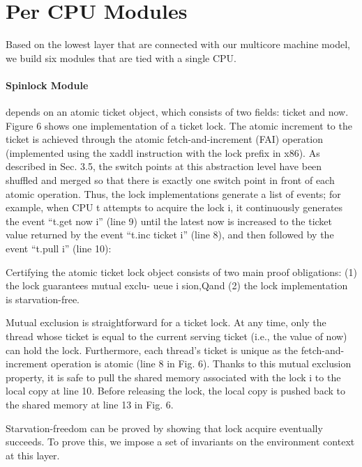 \section{Per CPU Modules}
\label{chapter:certikos:sec:per-cpu-modules}


Based on the lowest layer that are connected with our multicore machine model, 
we build six modules that are tied with a single CPU.

\paragraph{Spinlock Module}

depends on an atomic ticket object, which consists of two fields: ticket and now. Figure 6 shows one implementation of a ticket lock. The atomic increment to the ticket is achieved through the atomic fetch-and-increment (FAI) operation (implemented using the xaddl instruction with the lock prefix in x86). As described in Sec. 3.5, the switch points at this abstraction level have been shuffled and merged so that there is exactly one switch point in front of each atomic operation. Thus, the lock implementations generate a list of events; for example, when CPU t attempts to acquire the lock i, it continuously generates the event
“t.get now i” (line 9) until the latest now is increased to the ticket value returned by the event “t.inc ticket i” (line 8), and then followed by the event “t.pull i” (line 10):

Certifying the atomic ticket lock object consists of two main proof obligations: (1) the lock guarantees mutual exclu-
ueue i
sion,Qand (2) the lock implementation is starvation-free.

Mutual exclusion is straightforward for a ticket lock. At any time, only the thread whose ticket is equal to the current serving ticket (i.e., the value of now) can hold the lock. Furthermore, each thread’s ticket is unique as the fetch-and-increment operation is atomic (line 8 in Fig. 6). Thanks to this mutual exclusion property, it is safe to pull the shared memory associated with the lock i to the local copy at line 10. Before releasing the lock, the local copy is pushed back to the shared memory at line 13 in Fig. 6.

Starvation-freedom can be proved by showing that lock acquire eventually succeeds. To prove this, we impose a set of invariants on the environment context at this layer.



